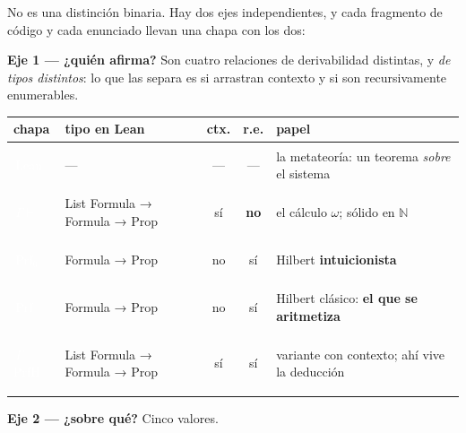 No es una distinción binaria. Hay dos ejes independientes, y cada fragmento de código y cada
enunciado llevan una chapa con los dos:

\noindent\textbf{Eje 1 — ¿quién afirma?} Son cuatro relaciones de derivabilidad distintas, y
\emph{de tipos distintos}: lo que las separa es si arrastran contexto y si son recursivamente
enumerables.

\begin{center}\footnotesize\setlength{\tabcolsep}{4pt}
\begin{tabularx}{\linewidth}{@{}l >{\ttfamily\scriptsize}l cc >{\raggedright\arraybackslash}X@{}}
\toprule
chapa & tipo en Lean & ctx. & r.e. & papel \\
\midrule
\colorbox{nvLean}{\textcolor{white}{\sffamily\scriptsize\bfseries\strut\,Lean\,}} &
  \normalfont--- & --- & --- & la metateoría: un teorema \emph{sobre} el sistema \\
\colorbox{nvDer}{\textcolor{white}{\sffamily\scriptsize\bfseries\strut\,$\Gamma\vdash$\,}} &
  List Formula → Formula → Prop & sí & \textbf{no} & el cálculo $\omega$; sólido en $\mathbb{N}$ \\
\colorbox{nvPrf0}{\textcolor{white}{\sffamily\scriptsize\bfseries\strut\,Prf$_0$\,}} &
  Formula → Prop & no & sí & Hilbert \textbf{intuicionista} \\
\colorbox{nvPrf}{\textcolor{white}{\sffamily\scriptsize\bfseries\strut\,Prf\,}} &
  Formula → Prop & no & sí & Hilbert clásico: \textbf{el que se aritmetiza} \\
\colorbox{nvPrfH}{\textcolor{white}{\sffamily\scriptsize\bfseries\strut\,$\Gamma\,$PrfH\,}} &
  List Formula → Formula → Prop & sí & sí & variante con contexto; ahí vive la deducción \\
\bottomrule
\end{tabularx}
\end{center}

\noindent\textbf{Eje 2 — ¿sobre qué?} Cinco valores.

